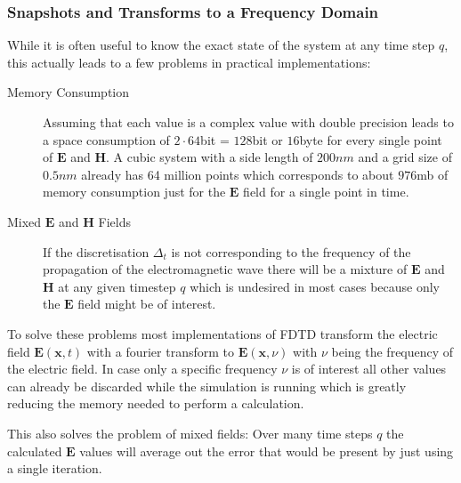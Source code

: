 \subsubsection{Snapshots and Transforms to a Frequency Domain}

While it is often useful to know the exact state of the system at any time step $q$, this actually leads to a few problems in practical implementations:

\begin{description}
  \item[Memory Consumption] Assuming that each value is a complex value with double precision leads to a space consumption of $2\cdot64$bit = $128$bit or $16$byte for every single point of $\mathbf{E}$ and $\mathbf{H}$. A cubic system with a side length of $200nm$ and a grid size of $0.5nm$ already has 64 million points which corresponds to about $976$mb of memory consumption just for the $\mathbf{E}$ field for a single point in time.
  \item[Mixed $\mathbf{E}$ and $\mathbf{H}$ Fields] If the discretisation $\Delta_t$ is not corresponding to the frequency of the propagation of the electromagnetic wave there will be a mixture of $\mathbf{E}$ and $\mathbf{H}$ at any given timestep $q$ which is undesired in most cases because only the $\mathbf{E}$ field might be of interest.
\end{description}

To solve these problems most implementations of FDTD transform the electric field $\mathbf{E}(\mathbf{x},t)$ with a fourier transform to $\mathbf{E}(\mathbf{x}, \nu)$ with $\nu$ being the frequency of the electric field. In case only a specific frequency $\nu$ is of interest all other values can already be discarded while the simulation is running which is greatly reducing the memory needed to perform a calculation.

This also solves the problem of mixed fields: Over many time steps $q$ the calculated $\mathbf{E}$ values will average out the error that would be present by just using a single iteration.
